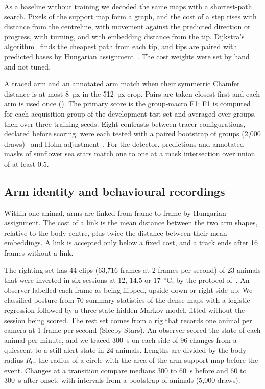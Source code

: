 As a baseline without training we decoded the same maps with a shortest-path search.
Pixels of the support map form a graph, and the cost of a step rises with distance from the centreline, with movement against the predicted direction or progress, with turning, and with embedding distance from the tip.
Dijkstra's algorithm~\cite{dijkstra1959note} finds the cheapest path from each tip, and tips are paired with predicted bases by Hungarian assignment~\cite{kuhn1955hungarian}.
The cost weights were set by hand and not tuned.

A traced arm and an annotated arm match when their symmetric Chamfer distance is at most 8~px in the 512~px crop.
Pairs are taken closest first and each arm is used once ().
The primary score is the group-macro F1: F1 is computed for each acquisition group of the development test set and averaged over groups, then over three training seeds.
Eight contrasts between tracer configurations, declared before scoring, were each tested with a paired bootstrap of groups (2,000 draws)~\cite{efron1979bootstrap} and Holm adjustment~\cite{holm1979simple}.
For the detector, predictions and annotated masks of sunflower sea stars match one to one at a mask intersection over union of at least 0.5.

\subsection*{Arm identity and behavioural recordings}

Within one animal, arms are linked from frame to frame by Hungarian assignment.
The cost of a link is the mean distance between the two arm shapes, relative to the body centre, plus twice the distance between their mean embeddings.
A link is accepted only below a fixed cost, and a track ends after 16 frames without a link.

The righting set has 44 clips (63,716 frames at 2 frames per second) of 23 animals that were inverted in six sessions at 12, 14.5 or 17~$^{\circ}$C, by the protocol of~\cite{hodin2025star}.
An observer labelled each frame as being flipped, upside down or right side up.
We classified posture from 70 summary statistics of the dense maps with a logistic regression followed by a three-state hidden Markov model, fitted without the session being scored.
The rest set comes from a rig that records one animal per camera at 1 frame per second (Sleepy Stars).
An observer scored the state of each animal per minute, and we traced 300~s on each side of 96 changes from a quiescent to a still-alert state in 24 animals.
Lengths are divided by the body radius $R_0$, the radius of a circle with the area of the arm-support map before the event.
Changes at a transition compare medians 300 to 60~s before and 60 to 300~s after onset, with intervals from a bootstrap of animals (5,000 draws).


